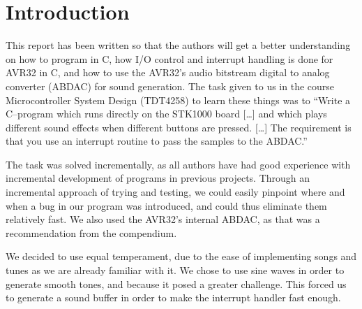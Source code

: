 \section{Introduction}

This report has been written so that the authors will get a better
understanding on how to program in C, how I/O control and interrupt
handling is done for AVR32 in C, and how to use the AVR32's audio
bitstream digital to analog converter (ABDAC) for sound generation. The
task given to us in the course Microcontroller System Design (TDT4258)
to learn these things was to ``Write a C–program which runs
directly on the STK1000 board [\ldots] and which plays different sound
effects when different buttons are pressed. [\ldots] The requirement is
that you use an interrupt routine to pass the samples to the ABDAC.''\cite{comp}

The task was solved incrementally, as all authors have had good experience
with incremental development of programs in previous projects. Through
an incremental approach of trying and testing, we could easily pinpoint where and when a bug
in our program was introduced, and could thus eliminate them relatively
fast. We also used the AVR32's internal ABDAC, as that was a
recommendation from the compendium.

We decided to use equal temperament, due to the ease of implementing
songs and tunes as we are already familiar with it. We chose to use sine
waves in order to generate smooth tones, and because it posed a greater
challenge. This forced us to generate a sound buffer in order to make
the interrupt handler fast enough.
